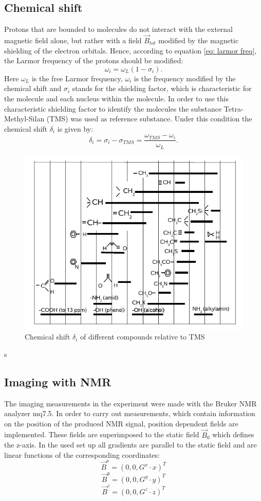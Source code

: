 \subsection{Chemical shift}
Protons that are bounded to molecules do not interact with the external magnetic field alone, but rather with a field $\vec{B}_{tot}$ modified by the magnetic shielding of the electron orbitals. Hence, according to equation \ref{eq: larmor freq}, the Larmor frequency of the protons should be modified:
\begin{equation}
\omega_i = \omega_L\left( 1 - \sigma_i\right).
\end{equation}
Here $\omega_L$ is the free Larmor frequency, $\omega_i$ is the frequency modified by the chemical shift and $\sigma_i$ stands for the shielding factor, which is characteristic for the molecule and each nucleus within the molecule.
In order to use this characteristic shielding factor to identify  the molecules the substance Tetra-Methyl-Silan (TMS) was used as reference substance. Under this condition the chemical shift $\delta_i$ is given by:
\begin{equation}
\delta_i = \sigma_i - \sigma_{TMS} = \frac{\omega_{TMS} - \omega_i}{\omega_L}.
\end{equation}
\begin{figure}[!htbp]
 \begin{center}
  \includegraphics[width = .6\textwidth]{Latex images/chemical-shift.png}
  \caption[]{Chemical shift $\delta_i$ of different compounds relative to TMS \footnotemark}
    \label{fig: chemical shift}
 \end{center}
\end{figure}

s\subsection{Imaging with NMR}
The imaging measurements in the experiment were made with the Bruker NMR analyzer mq7.5. 
In order to carry out measurements, which contain information on the position of the produced NMR signal, position dependent fields are implemented. These fields are superimposed to the static field $\vec{B}_0$ which defines the z-axis. In the used set up all gradients are parallel to the static field and are linear functions of the corresponding coordinates:
$$\vec{B}^x = (0,0,G^x\cdot x)^T$$
$$\vec{B}^y = (0,0,G^y\cdot y)^T$$
$$\vec{B}^z = (0,0,G^z\cdot z)^T$$
